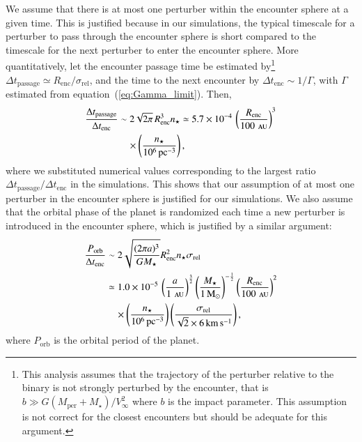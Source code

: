 \documentclass[iop,usenatbib]{emulateapj}
\newcommand{\msun}{\mathrm{M}_\odot}
\newcommand{\au}{\,\textsc{au}}
\newcommand{\renc}{R_\mathrm{enc}}
\newcommand{\mper}{M_\mathrm{per}}
\newcommand{\srel}{\sigma_\mathrm{rel}}
\begin{document}
We assume that there is at most one perturber within the encounter sphere at a given time. This is justified because in our simulations, the typical timescale for a perturber to pass through the encounter sphere is short compared to the timescale for the next perturber to enter the encounter sphere. More quantitatively, let the encounter passage time be estimated by\footnote{This analysis assumes that the trajectory of the perturber relative to the binary is not strongly perturbed by the encounter, that is $b\gg G(\mper+M_\star)/V_\infty^2$ where $b$ is the impact parameter. This assumption is not correct for the closest encounters but should be adequate for this argument.} $\Delta t_\mathrm{passage} \simeq \renc/\srel$, and the time to the next encounter by $\Delta t_\mathrm{enc} \sim 1/\Gamma$, with $\Gamma$ estimated from equation~(\ref{eq:Gamma_limit}). Then,
\begin{align}
\label{eq:ratio_t_pas_t_enc}
\nonumber \frac{\Delta t_\mathrm{passage}}{\Delta t_\mathrm{enc}} &\sim 2\sqrt{2\pi} \, \renc^3 n_\star \simeq 5.7 \times 10^{-4} \, \left ( \frac{\renc}{100\,\au} \right )^3 \\
&\quad \times \left ( \frac{n_\star}{10^6\,\mathrm{pc^{-3}}} \right ),
\end{align}
where we substituted numerical values corresponding to the largest ratio $\Delta t_\mathrm{passage}/\Delta t_\mathrm{enc}$ in the simulations. This shows that our assumption of at most one perturber in the encounter sphere is justified for our simulations. We also assume that the orbital phase of the planet is randomized each time a new perturber is introduced in the encounter sphere, which is justified by a similar argument:
\begin{align}
\nonumber \frac{P_\mathrm{orb}}{\Delta t_\mathrm{enc}} &\sim 2 \sqrt{ \frac{(2\pi a)^3}{G M_\star}} \renc^2 n_\star \srel \\
\nonumber &\simeq 1.0 \times 10^{-5} \, \left ( \frac{a}{1\,\au} \right )^{\frac{3}{2}} \left ( \frac{M_\star}{1\,\msun} \right )^{-\frac{1}{2}} \left ( \frac{\renc}{100\,\au} \right )^2 \\
&\quad \times \left ( \frac{n_\star}{10^6\,\mathrm{pc^{-3}}} \right ) \left ( \frac{\srel}{\sqrt{2} \times 6 \, \mathrm{km\,s^{-1}}} \right ),
\end{align}
where $P_\mathrm{orb}$ is the orbital period of the planet.
\end{document}
